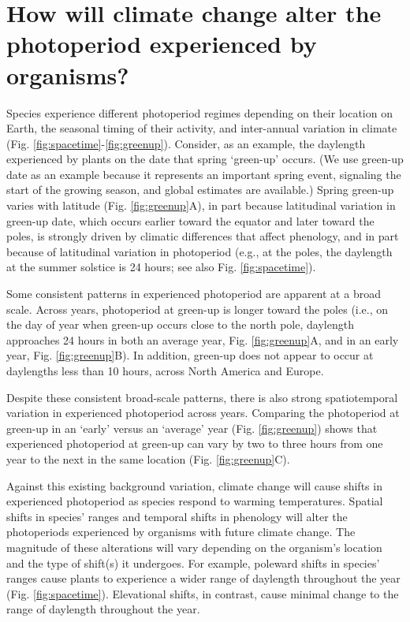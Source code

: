 \documentclass{article}
\begin{document}
\section*{How will climate change alter the photoperiod experienced by organisms?}
\par Species experience different photoperiod regimes depending on their location on Earth, the seasonal timing of their activity, and inter-annual variation in climate (Fig. \ref{fig:spacetime}-\ref{fig:greenup}). Consider, as an example, the daylength experienced by plants on the date that spring `green-up' occurs. (We use green-up date as an example  because it represents an important spring event, signaling the start of the growing season, and global estimates are available.) Spring green-up varies with latitude (Fig. \ref{fig:greenup}A), in part because latitudinal variation in green-up date, which occurs earlier toward the equator and later toward the poles, is strongly driven by climatic differences that affect phenology, and in part because of latitudinal variation in photoperiod (e.g., at the poles, the daylength at the summer solstice is 24 hours; see also Fig. \ref{fig:spacetime}). 
\par Some consistent patterns in experienced photoperiod are apparent at a broad scale. Across years, photoperiod at green-up is longer toward the poles (i.e., on the day of year when green-up occurs close to the north pole, daylength approaches 24 hours in both an average year, Fig. \ref{fig:greenup}A, and in an early year, Fig. \ref{fig:greenup}B). In addition, green-up does not appear to occur at daylengths less than 10 hours, across North America and Europe. 
\par Despite these consistent broad-scale patterns, there is also strong spatiotemporal variation in experienced photoperiod across years. Comparing the photoperiod at green-up in an `early' versus an `average' year (Fig. \ref{fig:greenup}) shows that experienced photoperiod at green-up can vary by two to three hours from one year to the next in the same location (Fig. \ref{fig:greenup}C).%

\par Against this existing background variation, climate change will cause shifts in experienced photoperiod as species respond to warming temperatures. Spatial shifts in species' ranges and temporal shifts in phenology will alter the photoperiods experienced by organisms with future climate change. The magnitude of these alterations will vary depending on the organism's location and the type of shift(s) it undergoes. For example, poleward shifts in species' ranges cause plants to experience a wider range of daylength throughout the year (Fig. \ref{fig:spacetime}). Elevational shifts, in contrast, cause minimal change to the range of daylength throughout the year.
\end{document}
